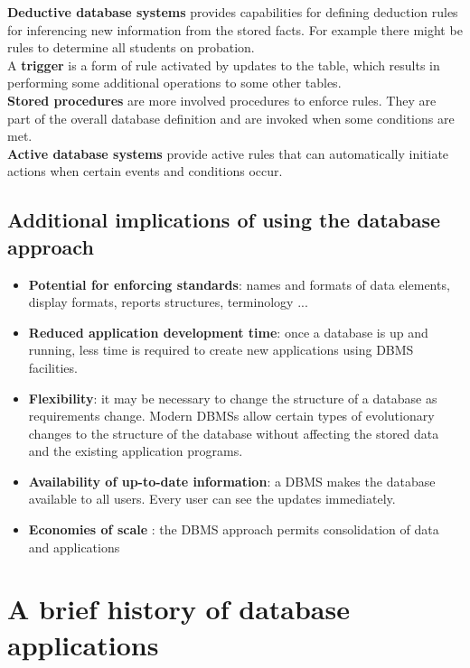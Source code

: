 \textbf{Deductive database systems} provides capabilities for defining deduction rules for inferencing new information from the stored facts. For example there might be rules to determine all students on probation. \\

A \textbf{trigger} is a form of rule activated by updates to the table, which results in performing some additional operations to some other tables.\\

\textbf{Stored procedures} are more involved procedures to enforce rules. They are part of the overall database definition and are invoked when some conditions are met. \\

\textbf{Active database systems} provide active rules that can automatically initiate actions when certain events and conditions occur.

\subsection{Additional implications of using the database approach}

\begin{itemize}
    \item \textbf{Potential for enforcing standards}: names and formats of data elements, display formats, reports structures, terminology ...
    \item \textbf{Reduced application development time}: once a database is up and running, less time is required to create new applications using DBMS facilities.
    \item \textbf{Flexibility}: it may be necessary to change the structure of a database as requirements change. Modern DBMSs allow certain types of evolutionary changes to the structure of the database without affecting the stored data and the existing application programs.
    \item \textbf{Availability of up-to-date information}: a DBMS makes the database available to all users. Every user can see the updates immediately. 
    \item \textbf{Economies of scale} : the DBMS approach permits consolidation of data and applications
\end{itemize}

\section{A brief history of database applications}

